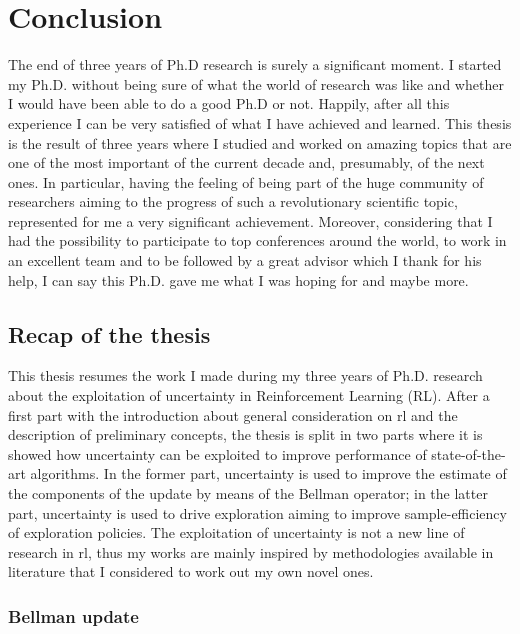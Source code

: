 \chapter{Conclusion}
The end of three years of Ph.D research is surely a significant moment. I started my Ph.D. without being sure of what the world of research was like and whether I would have been able to do a good Ph.D or not. Happily, after all this experience I can be very satisfied of what I have achieved and learned.
This thesis is the result of three years where I studied and worked on amazing topics that are one of the most important of the current decade and, presumably, of the next ones. In particular, having the feeling of being part of the huge community of researchers aiming to the progress of such a revolutionary scientific topic, represented for me a very significant achievement. Moreover, considering that I had the possibility to participate to top conferences around the world, to work in an excellent team and to be followed by a great advisor which I thank for his help, I can say this Ph.D. gave me what I was hoping for and maybe more.

\section{Recap of the thesis}
This thesis resumes the work I made during my three years of Ph.D. research about the exploitation of uncertainty in Reinforcement Learning (RL). After a first part with the introduction about general consideration on \gls{rl} and the description of preliminary concepts, the thesis is split in two parts where it is showed how uncertainty can be exploited to improve performance of state-of-the-art algorithms. In the former part, uncertainty is used to improve the estimate of the components of the update by means of the Bellman operator; in the latter part, uncertainty is used to drive exploration aiming to improve sample-efficiency of exploration policies. The exploitation of uncertainty is not a new line of research in \gls{rl}, thus my works are mainly inspired by methodologies available in literature that I considered to work out my own novel ones.

\subsection{Bellman update}
